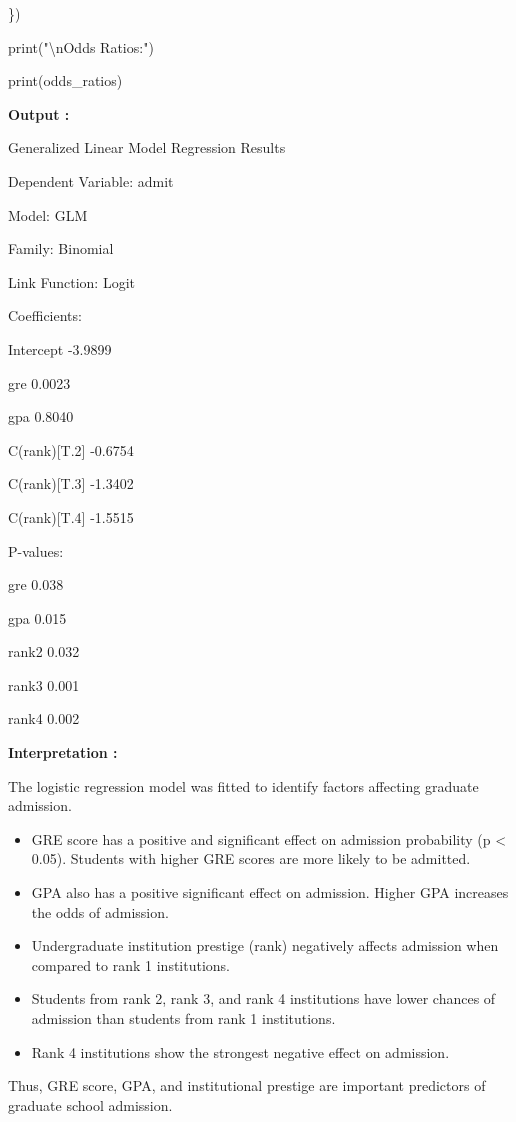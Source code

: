 \documentclass[
]{article}
\begin{document}
\})

print("\textbackslash nOdds Ratios:")

print(odds\_ratios)

\textbf{Output :}

Generalized Linear Model Regression Results

Dependent Variable: admit

Model: GLM

Family: Binomial

Link Function: Logit

Coefficients:

Intercept -3.9899

gre 0.0023

gpa 0.8040

C(rank){[}T.2{]} -0.6754

C(rank){[}T.3{]} -1.3402

C(rank){[}T.4{]} -1.5515

P-values:

gre 0.038

gpa 0.015

rank2 0.032

rank3 0.001

rank4 0.002

\textbf{Interpretation :}

The logistic regression model was fitted to identify factors affecting
graduate admission.

\begin{itemize}
\item
  GRE score has a positive and significant effect on admission
  probability (p \textless{} 0.05). Students with higher GRE scores are
  more likely to be admitted.
\item
  GPA also has a positive significant effect on admission. Higher GPA
  increases the odds of admission.
\item
  Undergraduate institution prestige (rank) negatively affects admission
  when compared to rank 1 institutions.
\item
  Students from rank 2, rank 3, and rank 4 institutions have lower
  chances of admission than students from rank 1 institutions.
\item
  Rank 4 institutions show the strongest negative effect on admission.
\end{itemize}

Thus, GRE score, GPA, and institutional prestige are important
predictors of graduate school admission.
\end{document}
